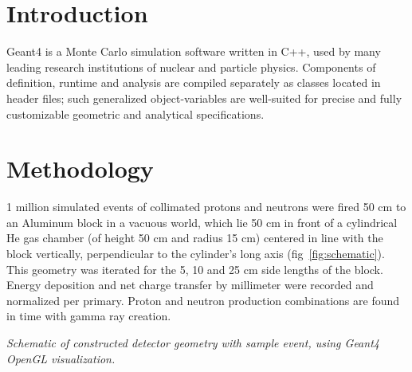 \documentclass[11pt]{article}
\makeatletter
\newenvironment{figurehere}
{\def\@captype{figure}}{}
\makeatother
\begin{document}
\begin{multicols}{2}

\section{Introduction}

Geant4 is a Monte Carlo simulation software written in C++, used by many leading research institutions of nuclear and particle physics\cite{Geant4:applications}.  Components of definition, runtime and analysis are compiled separately as classes located in header files; such generalized object-variables are well-suited for precise and fully customizable geometric and analytical specifications.

\section{Methodology}

1 million simulated events of collimated protons and neutrons were fired 50 cm to an Aluminum block in a vacuous world, which lie 50 cm in front of a cylindrical He gas chamber (of height 50 cm and radius 15 cm) centered in line with the block vertically, perpendicular to the cylinder's long axis (fig~\ref{fig:schematic}).  This geometry was iterated for the 5, 10 and 25 cm side lengths of the block.  Energy deposition and net charge transfer by millimeter were recorded and normalized per primary.  Proton and neutron production combinations are found in time with gamma ray creation.

\vspace{0.25 cm}
\begin{figurehere}
\centering
{}
\caption{\small \emph{Schematic of constructed detector geometry with sample event, using Geant4 OpenGL visualization.}}
\label{fig:schematic}
\end{figurehere}
\vspace{0.25 cm}


\end{multicols}
\end{document}
